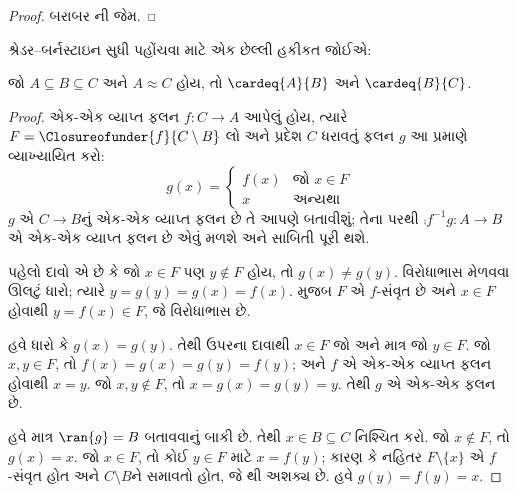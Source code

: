\begin{proof}
બરાબર ની જેમ.
\end{proof}

શ્રેડર--બર્નસ્ટાઇન સુધી પહોંચવા માટે એક છેલ્લી હકીકત જોઈએ:

\begin{prop}
જો $A \subseteq B \subseteq C$ અને $A \approx C$ હોય, તો
$\cardeq{A}{B}$ અને $\cardeq{B}{C}$.
\end{prop}

\begin{proof}
એક-એક વ્યાપ્ત ફલન $f \colon C \to A$ આપેલું હોય, ત્યારે $F =
\Closureofunder{f}{C \setminus B}$ લો અને પ્રદેશ $C$ ધરાવતું ફલન
$g$ આ પ્રમાણે વ્યાખ્યાયિત કરો:
\[
	g(x) =
	\begin{cases}
			f(x) &\text{જો $x \in F$}\\
			x & \text{અન્યથા}
		\end{cases}
\]
$g$ એ $C \to B$નું એક-એક વ્યાપ્ત ફલન છે તે આપણે બતાવીશું; તેના પરથી
$\comp{f^{-1}}{g} \colon A \to B$ એ એક-એક વ્યાપ્ત ફલન છે એવું મળશે અને
સાબિતી પૂરી થશે.

પહેલો દાવો એ છે કે જો $x \in F$ પણ $y\notin F$ હોય, તો
$g(x) \neq g(y)$. વિરોધાભાસ મેળવવા ઊલટું ધારો; ત્યારે
$y = g(y) = g(x) = f(x)$.  મુજબ $F$ એ
$f$-સંવૃત છે અને $x \in F$ હોવાથી $y = f(x) \in F$, જે વિરોધાભાસ છે.

હવે ધારો કે $g(x) = g(y)$. તેથી ઉપરના દાવાથી $x \in F$ જો અને માત્ર
જો $y \in F$. જો $x, y \in F$, તો $f(x) = g (x) = g(y) = f(y)$;
અને $f$ એ એક-એક વ્યાપ્ત ફલન હોવાથી $x = y$. જો $x, y \notin F$, તો
$x = g(x) = g(y) = y$. તેથી $g$ એ એક-એક ફલન છે.

હવે માત્ર $\ran{g} = B$ બતાવવાનું બાકી છે. તેથી $x \in B \subseteq C$
નિશ્ચિત કરો. જો $x \notin F$, તો $g(x) = x$. જો $x \in F$, તો કોઈ
$y \in F$ માટે $x = f(y)$; કારણ કે નહિતર $F \setminus \{x\}$ એ
$f$-સંવૃત હોત અને $C\setminus B$ને સમાવતો હોત, જે
થી અશક્ય છે. હવે $g(y) = f(y) = x$.
\end{proof}

